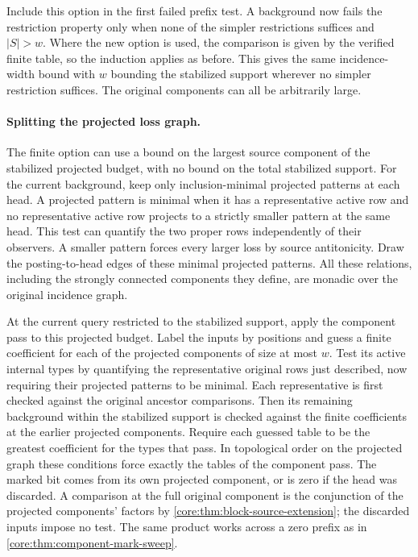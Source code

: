 Include this option in the first failed prefix test. A
background now fails the restriction property only when
none of the simpler restrictions suffices and $|S|>w$.
Where the new option is used, the comparison is given by
the verified finite table, so the induction applies as
before. This gives the same incidence-width bound with $w$
bounding the stabilized support wherever
no simpler restriction suffices. The original components
can all be arbitrarily large.

\paragraph{Splitting the projected loss graph.}
The finite option can use a bound on the largest source
component of the stabilized projected budget, with no bound
on the total stabilized support. For the current background,
keep only inclusion-minimal projected patterns at each head.
A projected pattern is minimal when it has a representative
active row and no representative active row projects to a
strictly smaller pattern at the same head. This test can
quantify the two proper rows independently of their
observers. A smaller pattern forces every larger loss by
source antitonicity. Draw the posting-to-head edges of
these minimal projected patterns. All these relations,
including the strongly connected components they define,
are monadic over the original incidence graph.

At the current query restricted to the stabilized support,
apply the component pass to this projected budget. Label
the inputs by positions and guess a finite coefficient
for each of the projected components of size at most $w$.
Test its active internal types by quantifying the
representative original rows just described, now requiring
their projected patterns to be minimal. Each representative
is first checked against the original ancestor comparisons.
Then its remaining background within the stabilized support
is checked against the finite coefficients at the earlier
projected components. Require each guessed table to be the
greatest coefficient for the types that pass. In topological
order on the projected graph these conditions force exactly
the tables of the component pass. The marked bit comes from
its own projected component, or is zero if the head was
discarded. A comparison at the full original component is
the conjunction of the projected components' factors by
\cref{core:thm:block-source-extension}; the discarded inputs
impose no test. The same product works across a zero prefix
as in \cref{core:thm:component-mark-sweep}.

